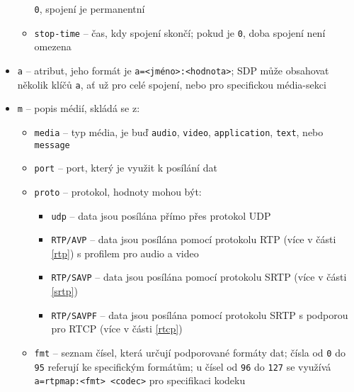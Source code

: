 \begin{itemize}
\begin{itemize}
		            \texttt{0}, spojení je permanentní
		      \item \texttt{stop-time} -- čas, kdy spojení skončí; pokud je
		            \texttt{0}, doba spojení není omezena
	      \end{itemize}
	\item \texttt{a} -- atribut, jeho formát je
	      \texttt{a=<jméno>:<hodnota>}; SDP může obsahovat několik
	      klíčů \texttt{a}, ať už pro celé spojení, nebo pro
	      specifickou média-sekci
	\item \texttt{m} -- popis médií, skládá se z:
	      \begin{itemize}
		      \item \texttt{media} -- typ média, je buď
		            \texttt{audio}, \texttt{video},
		            \texttt{application}, \texttt{text},
		            nebo \texttt{message}
		      \item \texttt{port} -- port, který je využit k posílání
		            dat
		      \item \texttt{proto} -- protokol, hodnoty mohou být:
		            \begin{itemize}
			            \item \texttt{udp} -- data jsou posílána přímo
			                  přes protokol UDP
			            \item \texttt{RTP/AVP} -- data jsou posílána
			                  pomocí protokolu RTP (více v části \ref{rtp}) s
			                  profilem pro audio a video
			            \item \texttt{RTP/SAVP} -- data jsou posílána
			                  pomocí protokolu SRTP (více v části \ref{srtp})
			            \item \texttt{RTP/SAVPF} -- data jsou posílána
			                  pomocí protokolu SRTP s podporou pro RTCP (více v
			                  části \ref{rtcp})
		            \end{itemize}
		      \item \texttt{fmt} -- seznam čísel, která určují
		            podporované formáty dat; čísla od \texttt{0} do
		            \texttt{95} referují ke specifickým formátům; u
		            čísel od \texttt{96} do \texttt{127} se
		            využívá \texttt{a=rtpmap:<fmt> <codec>} pro
		            specifikaci kodeku
	      \end{itemize}
\end{itemize}

